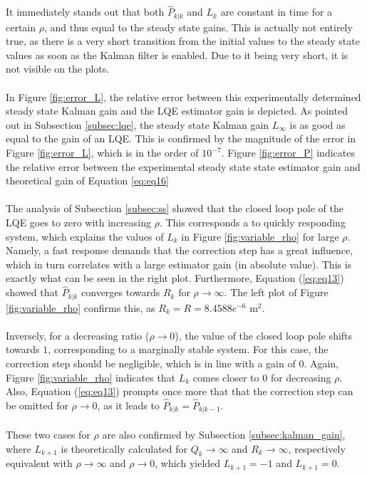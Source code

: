 \documentclass[a4paper,kul]{kulakarticle} %
\begin{document}
\noindent It immediately stands out that both $\hat{P}_{k|k}$ and $L_k$ are constant in time for a certain $\rho$, and thus equal to the steady state gains. This is actually not entirely true, as there is a very short transition from the initial values to the steady state values as soon as the Kalman filter is enabled. Due to it being very short, it is not visible on the plots. 
\\\\
In Figure \ref{fig:error_L}, the relative error between this experimentally determined steady state Kalman gain and the LQE estimator gain is depicted. As pointed out in Subsection \ref{subsec:lqe}, the steady state Kalman gain $L_\infty$ is as good as equal to the gain of an LQE. This is confirmed by the magnitude of the error in Figure \ref{fig:error_L}, which is in the order of $10^{-7}$. Figure \ref{fig:error_P} indicates the relative error between the experimental steady state state estimator gain and theoretical gain of Equation \ref{eq:eq16}
\\\\
The analysis of Subsection \ref{subsec:ss} showed that the closed loop pole of the LQE goes to zero with increasing $\rho$. This corresponds a to quickly responding system, which explains the values of $L_k$ in Figure \ref{fig:variable_rho} for large $\rho$. Namely, a fast response demands that the correction step has a great influence, which in turn correlates with a large estimator gain (in absolute value). This is exactly what can be seen in the right plot. Furthermore, Equation (\ref{eq:eq13}) showed that $\hat{P}_{k|k}$ converges towards $R_k$ for $\rho \rightarrow \infty$. The left plot of Figure \ref{fig:variable_rho} confirms this, as $R_k = R = 8.4588 e^{-6}$ m$^2$.
\\\\
Inversely, for a decreasing ratio ($\rho \rightarrow 0$), the value of the closed loop pole shifts towards $1$, corresponding to a marginally stable system. For this case, the correction step should be negligible, which is in line with a gain of $0$. Again, Figure \ref{fig:variable_rho} indicates that $L_k$ comes closer to $0$ for decreasing $\rho$. Also, Equation (\ref{eq:eq13}) prompts once more that that the correction step can be omitted for $\rho \rightarrow 0$, as it leads to $\hat{P}_{k|k} = \hat{P}_{k|k-1}$.
\\\\
These two cases for $\rho$ are also confirmed by Subsection \ref{subsec:kalman_gain}, where $L_{k+1}$ is theoretically calculated for $Q_k \rightarrow \infty$ and $R_k \rightarrow \infty$, respectively equivalent with $\rho \rightarrow \infty$ and  $\rho \rightarrow 0$, which yielded $L_{k+1}  = -1$ and $L_{k+1}  = 0$.
\end{document}
